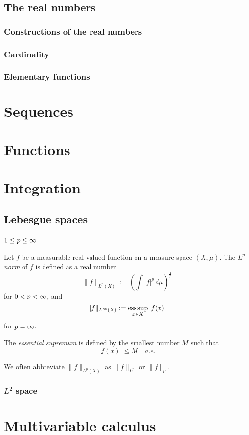 \documentclass{../crs}
\begin{document}
\section{The real numbers}
\subsection{Constructions of the real numbers}

\subsection{Cardinality}

\subsection{Elementary functions}





\chapter{Sequences}


\chapter{Functions}


\chapter{Integration}




\section{Lebesgue spaces}

\subsection{$1\le p\le\infty$}

\begin{defn}
Let $f$ be a measurable real-valued function on a measure space $(X,\mu)$.
The \emph{$L^p$ norm} of $f$ is defined as a real number
\[\|f\|_{L^p(X)}:=(\int|f|^p\,d\mu)^{\frac1p}\]
for $0<p<\infty$, and
\[\|f\|_{L^\infty(X)}:=\operatorname*{ess\,sup}_{x\in X}|f(x)|\]
for $p=\infty$.
\end{defn}
\begin{defn}
The \emph{essential supremum} is defined by the smallest number $M$ such that
\[|f(x)|\le M\quad a.e.\]
\end{defn}
We often abbreviate $\|f\|_{L^p(X)}$ as $\|f\|_{L^p}$ or $\|f\|_p$.






\subsection{$L^2$ space}





\chapter{Multivariable calculus}
\end{document}
